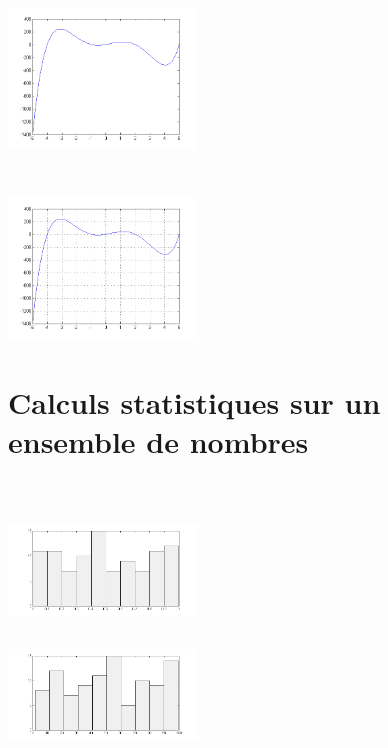 \documentclass[10pt]{article}
\begin{document}
  \subsection{}
   \inputminted[linenos,firstnumber=18,firstline=18,lastline=21]{matlab}{un.m}
   \includegraphics[width=5cm]{2C}
  \subsection{}
   \inputminted[linenos,firstnumber=22,firstline=22,lastline=28]{matlab}{un.m}
   \includegraphics[width=5cm]{2D}

 \section{Calculs statistiques sur un ensemble de nombres}
  \inputminted[linenos,firstnumber=29,firstline=29,lastline=31]{matlab}{un.m}
  \subsection{}
   \inputminted[linenos,firstnumber=32,firstline=32,lastline=33]{matlab}{un.m}
   \includegraphics[width=5cm]{3AN}
   \inputminted[linenos,firstnumber=34,firstline=34,lastline=34]{matlab}{un.m}
   \includegraphics[width=5cm]{3AU}
\end{document}
